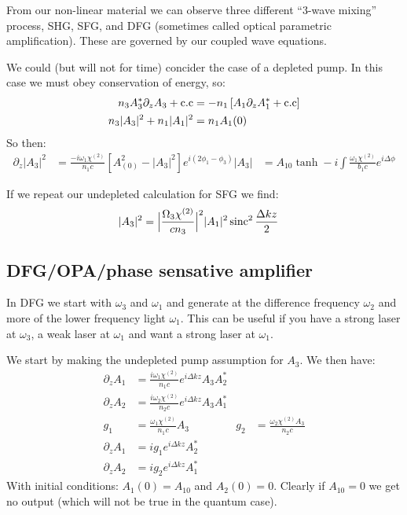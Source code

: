 From our non-linear material we can observe three different ``3-wave mixing'' process, SHG, SFG, and DFG (sometimes called optical parametric amplification). These are governed by our coupled wave equations.

We could (but will not for time) concider the case of a depleted pump. In this case we must obey conservation of energy, so:
\begin{align*}
	n_3 A_3^*\partial_z A_3 + \text{c.c} &= - n_1\left[A_1\partial_z A_1^* + \text{c.c}\right] \\
	n_3 |A_3|^2  + n_1 |A_1|^2 &= n_1 A_1(0)
\end{align*}
So then:
\begin{align*}
	\partial_z |A_3|^2 &= \frac{-i\omega_1\chi^{(2)}}{n_1 c} \left[A_(0)^2 - |A_3|^2\right] e^{i(2\phi_1-  \phi_3)}
	|A_3| &= A_{10}\tanh -i\int \frac{\omega_1\chi^{(2)}}{b_1 c} e^{i\Delta\phi}
\end{align*}

If we repeat our undepleted calculation for SFG we find:
\begin{align*}
	|A_3|^2 &= \Big|\frac{\Omega_3\chi^{(2)}}{cn_3}\Big|^2|A_1|^2 \operatorname{sinc}^2 \frac{\Delta k z}{2}
\end{align*}
\subsection{DFG/OPA/phase sensative amplifier}
In DFG we start with $\omega_3$ and $\omega_1$ and generate at the difference frequency $\omega_2$ and more of the lower frequency light $\omega_1$.
This can be useful if you have a strong laser at $\omega_3$, a weak laser at $\omega_1$ and want a strong laser at $\omega_1$.

We start by making the undepleted pump assumption for $A_3$. We then have:
\begin{align*}
	\partial_z A_1 &= \frac{i\omega_1\chi^{(2)}}{n_1 c} e^{i\Delta k z} A_3 A_2^* \\
	\partial_z A_2 &= \frac{i\omega_2\chi^{(2)}}{n_2 c} e^{i\Delta k z} A_3 A_1^* \\
	g_1 &= \frac{\omega_1 \chi^{(2)}}{n_1 c} A_3 & g_2 &= \frac{\omega_2\chi^{(2)} A_3}{n_2 c} \\
	\partial_z A_1 &= ig_1 e^{i\Delta k z} A_2^* \\
	\partial_z A_2 &= ig_2 e^{i\Delta k z} A_1^*
\end{align*}
With initial conditions: $A_1(0) = A_{10}$ and $A_2(0) = 0$. Clearly if $A_{10} = 0$ we get no output (which will not be true in the quantum case).

